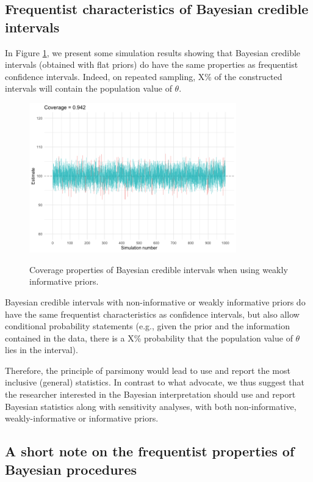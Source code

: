 \documentclass[a4paper,man,natbib,floatsintext,donotrepeattitle]{apa6}
\begin{document}
\subsection{Frequentist characteristics of Bayesian credible intervals}

In Figure \ref{fig:coverage}, we present some simulation results showing that Bayesian credible intervals (obtained with flat priors) do have the same properties as frequentist confidence intervals. Indeed, on repeated sampling, X\% of the constructed intervals will contain the population value of $\theta$.

\begin{figure}[H]
  \caption{Coverage properties of Bayesian credible intervals when using weakly informative priors.}
  \centering
  \includegraphics[width=0.8\textwidth]{coverage.png}
  \label{fig:coverage}
\end{figure}

Bayesian credible intervals with non-informative or weakly informative priors do have the same frequentist characteristics as confidence intervals, but also allow conditional probability statements (e.g., given the prior and the information contained in the data, there is a X\% probability that the population value of $\theta$ lies in the interval).

Therefore, the principle of parsimony would lead to use and report the most inclusive (general) statistics. In contrast to what \cite{albers_credible_2018} advocate, we thus suggest that the researcher interested in the Bayesian interpretation should use and report Bayesian statistics along with sensitivity analyses, with both non-informative, weakly-informative or informative priors.

\subsection{A short note on the frequentist properties of Bayesian procedures}
\end{document}
